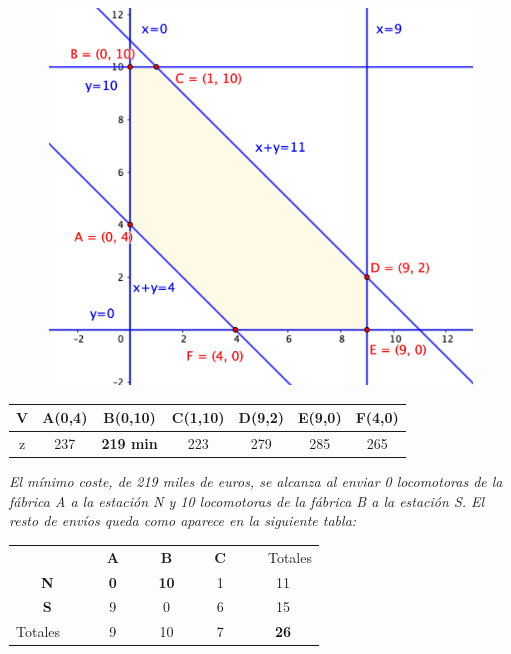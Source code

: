 \begin{figure}[H]
	\centering
	\includegraphics[width=.75\textwidth]{imagenes/img34.png}
\end{figure}

\begin{table}[H]
\centering
\begin{tabular}{|c|c|c|c|c|c|c|}
\hline
V & A(0,4) & B(0,10)          & C(1,10) & D(9,2) & E(9,0) & F(4,0) \\ \hline
z & 237    & \textbf{219 min} & 223     & 279    & 285    & 265    \\ \hline
\end{tabular}
\end{table}

\emph{El mínimo coste, de 219 miles de euros, se alcanza al enviar 0 locomotoras de la fábrica A a la estación N y 10 locomotoras de la fábrica B a la estación S. El resto de envíos queda como aparece en la siguiente tabla:}

\begin{table}[H]
\centering
\begin{tabular}{cc|c|c|c}
                                     & \textbf{$\quad$A$\quad$} & \textbf{$\quad$B$\quad$} & \textbf{$\quad$C$\quad$} & $\quad$Totales \\ \cline{2-5} 
\multicolumn{1}{c|}{\textbf{N}}      & \textbf{0}               & \textbf{10}              & 1                        & 11             \\ \hline
\multicolumn{1}{c|}{\textbf{S}}      & 9                        & 0                        & 6                        & 15             \\ \hline
\multicolumn{1}{c|}{Totales $\quad$} & 9                        & 10                       & 7                        & \textbf{26}    \\ \cline{2-4}
\end{tabular}
\end{table}


